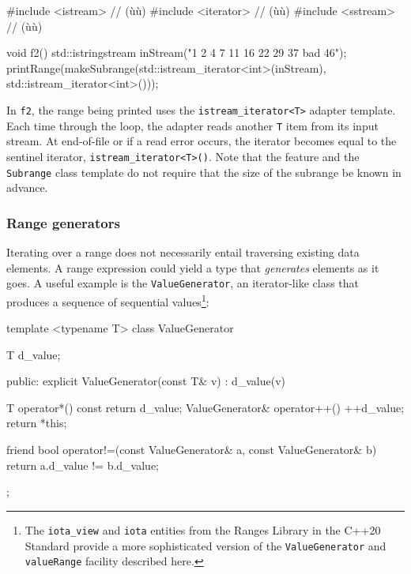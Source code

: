 {{\begin{emcppslisting}[emcppsbatch=e2]
#include <istream>   // (ù{}ù)
#include <iterator>  // (ù{}ù)
#include <sstream>   // (ù{}ù)

void f2()
{
    std::istringstream inStream("1 2 4 7 11 16 22 29 37 bad 46");
    printRange(makeSubrange(std::istream_iterator<int>(inStream),
                            std::istream_iterator<int>()));
}
\end{emcppslisting}
    

\noindent In \lstinline!f2!, the range being printed uses the
\lstinline!istream_iterator<T>! adapter template. Each time through the
loop, the adapter reads another \lstinline!T! item from its input stream.
At end-of-file or if a read error occurs, the iterator becomes equal to
the sentinel iterator, \lstinline!istream_iterator<T>()!. Note that the
 feature and the \lstinline!Subrange!
class template do not require that the size of the subrange be known in
advance.

\subsubsection[Range generators]{Range generators}\label{range-generators}

Iterating over a range does not necessarily entail traversing existing
data elements. A range expression could yield a type that
\emph{generates} elements as it goes. A useful example is the
\lstinline!ValueGenerator!, an iterator-like class that produces a sequence
of sequential values{\cprotect\footnote{The \lstinline!iota_view! and
\lstinline!iota! entities from the Ranges Library in the C++20 Standard
provide a more sophisticated version of the \lstinline!ValueGenerator!
  and \lstinline!valueRange! facility described here.}}:

\begin{emcppslisting}[emcppsbatch=e2]
template <typename T>
class ValueGenerator
{
    T d_value;

  public:
    explicit ValueGenerator(const T& v) : d_value(v) { }

    T operator*() const { return d_value; }
    ValueGenerator& operator++() { ++d_value; return *this; }

    friend bool operator!=(const ValueGenerator& a, const ValueGenerator& b)
    {
        return a.d_value != b.d_value;
    }
};


\end{emcppslisting}}}
